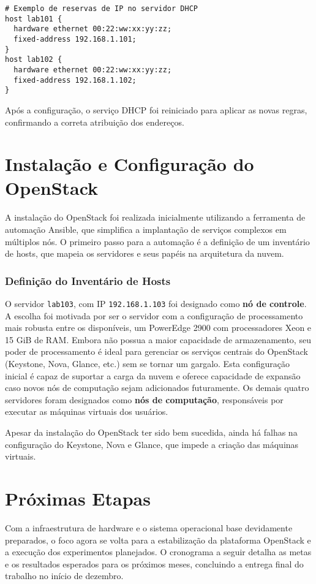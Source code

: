 \begin{verbatim}
# Exemplo de reservas de IP no servidor DHCP
host lab101 {
  hardware ethernet 00:22:ww:xx:yy:zz;
  fixed-address 192.168.1.101;
}
host lab102 {
  hardware ethernet 00:22:ww:xx:yy:zz;
  fixed-address 192.168.1.102;
}
\end{verbatim}

Após a configuração, o serviço DHCP foi reiniciado para aplicar as novas regras, confirmando a correta atribuição dos endereços.

\section{Instalação e Configuração do OpenStack}

A instalação do OpenStack foi realizada inicialmente utilizando a ferramenta de automação Ansible, que simplifica a implantação de serviços complexos em múltiplos nós. O primeiro passo para a automação é a definição de um inventário de hosts, que mapeia os servidores e seus papéis na arquitetura da nuvem.

\subsubsection*{Definição do Inventário de Hosts}
O servidor \texttt{lab103}, com IP \texttt{192.168.1.103} foi designado como \textbf{nó de controle}. A escolha foi motivada por ser o servidor com a configuração de processamento mais robusta entre os disponíveis, um PowerEdge 2900 com processadores Xeon e 15 GiB de RAM. Embora não possua a maior capacidade de armazenamento, seu poder de processamento é ideal para gerenciar os serviços centrais do OpenStack (Keystone, Nova, Glance, etc.) sem se tornar um gargalo. Esta configuração inicial é capaz de suportar a carga da nuvem e oferece capacidade de expansão caso novos nós de computação sejam adicionados futuramente. Os demais quatro servidores foram designados como \textbf{nós de computação}, responsáveis por executar as máquinas virtuais dos usuários.

Apesar da instalação do OpenStack ter sido bem sucedida, ainda há falhas na configuração do Keystone, Nova e Glance, que impede a criação das máquinas virtuais.

\section{Próximas Etapas}

Com a infraestrutura de hardware e o sistema operacional base devidamente preparados, o foco agora se volta para a estabilização da plataforma OpenStack e a execução dos experimentos planejados. O cronograma a seguir detalha as metas e os resultados esperados para os próximos meses, concluindo a entrega final do trabalho no início de dezembro.

